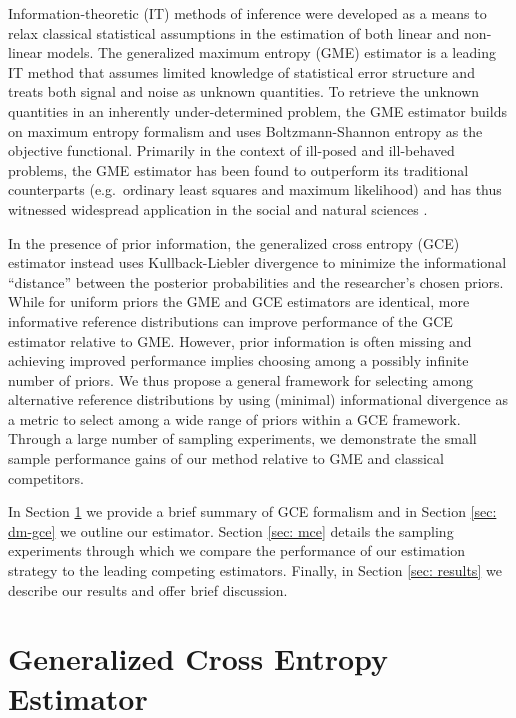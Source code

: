 \documentclass{elsarticle}
\begin{document}
Information-theoretic (IT) methods of inference were developed as a means to
relax classical statistical assumptions in the estimation of both linear and 
non-linear models.
The generalized maximum entropy (GME) estimator is a leading IT method 
that assumes limited knowledge of statistical error structure and treats both
signal and noise as unknown quantities.
To retrieve the unknown quantities in an inherently under-determined problem, 
the GME estimator builds on maximum entropy formalism \citep{jaynes1957a,
 jaynes1957b} 
and uses Boltzmann-Shannon entropy \citep{shannon1948} as the objective 
functional.
Primarily in the context of ill-posed and ill-behaved problems, the GME 
estimator has been found to outperform its traditional counterparts 
(e.g.\ ordinary least squares and maximum likelihood) and has thus
witnessed widespread application in the social and natural sciences 
\citep{golan1996}. 

In the presence of prior information, the generalized cross entropy (GCE) 
estimator instead uses Kullback-Liebler divergence \citep{kullback1951} 
to minimize the informational ``distance'' between the posterior 
probabilities and the researcher's chosen priors.
While for uniform priors the GME and GCE estimators are identical,  
more informative reference distributions can improve performance of the 
GCE estimator relative to GME. 
However, prior information is often missing and achieving improved 
performance implies choosing among a possibly infinite number of priors.
We thus propose a general framework for selecting among alternative 
reference distributions by using (minimal) informational divergence as a 
metric to select among a wide range of priors within a GCE framework.
Through a large number of sampling experiments, we demonstrate the 
small sample performance gains of our method relative to GME and 
classical competitors.

In Section \ref{sec: gce} we provide a brief summary of GCE formalism and 
in Section \ref{sec: dm-gce} we outline our estimator. 
Section \ref{sec: mce} details the sampling experiments through which we 
compare the performance of our estimation strategy to the leading competing 
estimators. 
Finally, in Section \ref{sec: results} we describe our results and offer 
brief discussion.


\section{Generalized Cross Entropy Estimator}
\label{sec: gce}
\end{document}
